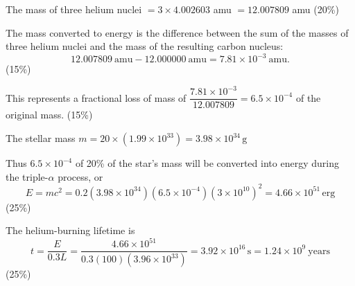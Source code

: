 The mass of three helium nuclei $= 3 \times 4.002603$ amu $= 12.007809$ amu
\hfill(20\%)

The mass converted to energy is the difference between the sum of the masses of
three helium nuclei and the mass of the resulting carbon nucleus:
\[
  12.007809\ \text{amu} - 12.000000\ \text{amu} = 7.81 \times 10^{-3}\ \text{amu}.
\]
\hfill(15\%)

This represents a fractional loss of mass of
$\dfrac{7.81 \times 10^{-3}}{12.007809} = 6.5 \times 10^{-4}$ of the original
mass.
\hfill(15\%)

The stellar mass $m = 20 \times \left(1.99 \times 10^{33}\right) = 3.98 \times 10^{34}\,\mathrm{g}$

Thus $6.5 \times 10^{-4}$ of 20\% of the star's mass will be converted into
energy during the triple-$\alpha$ process, or
\[
  E = mc^2 = 0.2(3.98 \times 10^{34})(6.5 \times 10^{-4})(3 \times 10^{10})^2
    = 4.66 \times 10^{51}\,\mathrm{erg}
\]
\hfill(25\%)

The helium-burning lifetime is
\[
  t = \frac{E}{0.3L}
    = \frac{4.66 \times 10^{51}}{0.3(100)(3.96 \times 10^{33})}
    = 3.92 \times 10^{16}\,\mathrm{s} = 1.24 \times 10^{9}\ \text{years}
\]
\hfill(25\%)
